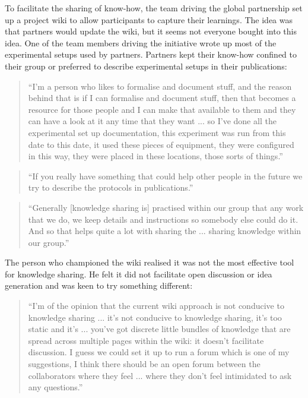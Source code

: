 To facilitate the sharing of know-how, the team driving the global partnership set up a project wiki to allow participants to capture their learnings. The idea was that partners would update the wiki, but it seems not everyone bought into this idea. One of the team members driving the initiative wrote up most of the experimental setups used by partners. Partners kept their know-how confined to their group or preferred to describe experimental setups in their publications:

\begin{quote}
\small
\enquote{I'm a person who likes to formalise and document stuff, and the reason behind that is if I can formalise and document stuff, then that becomes a resource for those people and I can make that available to them and they can have a look at it any time that they want ... so I've done all the experimental set up documentation, this experiment was run from this date to this date, it used these pieces of equipment, they were configured in this way, they were placed in these locations, those sorts of things.} \\
\end{quote}

\begin{quote}
\small
\enquote{If you really have something that could help other people in the future we try to describe the protocols in publications.} \\
\end{quote}

\begin{quote}
\small
\enquote{Generally [knowledge sharing is] practised within our group that any work that we do, we keep details and instructions so somebody else could do it. And so that helps quite a lot with sharing the ... sharing knowledge within our group.} \\
\end{quote}

The person who championed the wiki realised it was not the most effective tool for knowledge sharing. He felt it did not facilitate open discussion or idea generation and was keen to try something different:

\begin{quote}
\small
\enquote{I'm of the opinion that the current wiki approach is not conducive to knowledge sharing ... it's not conducive to knowledge sharing, it’s too static and it's ... you've got discrete little bundles of knowledge that are spread across multiple pages within the wiki: it doesn't facilitate discussion. I guess we could set it up to run a forum which is one of my suggestions, I think there should be an open forum between the collaborators where they feel ... where they don't feel intimidated to ask any questions.} \\
\end{quote}

